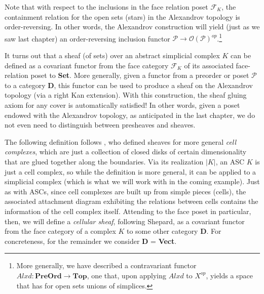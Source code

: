 \documentclass[11pt]{book}
\theoremstyle{definition}
\theoremstyle{definition}
\theoremstyle{definition}
\theoremstyle{theorem}
\theoremstyle{definition}
\begin{document}
	Note that with respect to the inclusions in the face relation poset $\mathcal{F}_K$, the containment relation for the open sets (stars) in the Alexandrov topology is order-reversing. In other words, the Alexandrov construction will yield (just as we saw last chapter) an order-reversing inclusion functor $\mathcal{P} \rightarrow \mathscr{O}(\mathcal{P})^{op}$.\footnote{More generally, we have described a contravariant functor $Alxd: \textbf{PreOrd} \rightarrow \textbf{Top}$, one that, upon applying $Alxd$ to $X^{op}$, yields a space that has for open sets unions of simplices.} \par 
	It turns out that a sheaf (of sets) over an abstract simplicial complex $K$ can be defined as a covariant functor from the face category $\mathcal{F}_K$ of its associated face-relation poset to \textbf{Set}. More generally, given a functor from a preorder or poset $\mathcal{P}$ to a category \textbf{D}, this functor can be used to produce a sheaf on the Alexandrov topology (via a right Kan extension). With this construction, the sheaf gluing axiom for any cover is automatically satisfied! In other words, given a poset endowed with the Alexandrov topology, as anticipated in the last chapter, we do not even need to distinguish between presheaves and sheaves. \par 
The following definition follows \cite{shepard_cellular_1985}, who defined sheaves for more general \textit{cell complexes}, which are just a collection of closed disks of certain dimensionality that are glued together along the boundaries. Via its realization $|K|$, an ASC $K$ is just a cell complex, so while the definition is more general, it can be applied to a simplicial complex (which is what we will work with in the coming example). Just as with ASCs, since cell complexes are built up from simple pieces (cells), the associated attachment diagram exhibiting the relations between cells contains the information of the cell complex itself. Attending to the face poset in particular, then, we will define a \textit{cellular sheaf}, following Shepard, as a covariant functor from the face category of a complex $K$ to some other category \textbf{D}. For concreteness, for the remainder we consider \textbf{D} = \textbf{Vect}.
\end{document}

